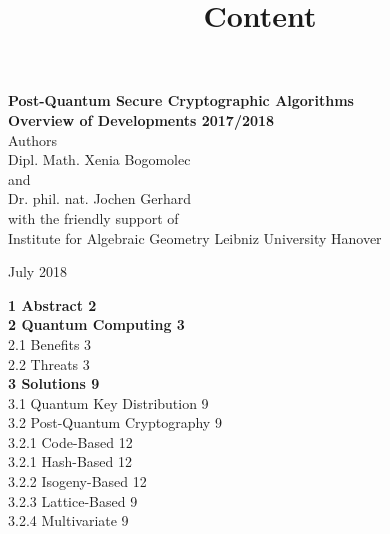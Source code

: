 \documentclass[a4paper,11pt]{article}
\begin{document}
\begin{titlepage}
\begin{center}

{\Huge{\textbf{Post-Quantum Secure Cryptographic Algorithms}}}\\[2cm]

\huge{\textbf{Overview of Developments 2017/2018}}\\[1cm]

\large{Authors}\\[0,2cm]

\Large{Dipl. Math. Xenia Bogomolec}\\ [0,2cm]  
\large{and }\\[0,2cm] 

\Large{Dr. phil. nat. Jochen Gerhard}\\ [1,4cm] 


\large{with the friendly support of}\\[0,2cm]

\Large{Institute for Algebraic Geometry Leibniz University Hanover}\\[1cm]


 
\vspace{1cm}
 
\large{July 2018}
\end{center}
\end{titlepage}


\title{\textbf{\Large{Content}}}
\maketitle


\noindent
\textbf{1 Abstract \hfill 2}\\[0,5cm]
\textbf{2 Quantum Computing \hfill 3}\\[0,3cm]
	\hspace*{0,5cm}2.1 Benefits \hfill 3\\[0,3cm]
	\hspace*{0,5cm}2.2 Threats \hfill 3\\[0,3cm]
\textbf{3 Solutions \hfill 9}\\[0,3cm]
	\hspace*{0,5cm}3.1 Quantum Key Distribution \hfill 9\\[0,3cm]
	\hspace*{0,5cm}3.2 Post-Quantum Cryptography \hfill 9\\[0,3cm]
		\hspace*{1cm}3.2.1 Code-Based \hfill 12\\[0,3cm]
		\hspace*{1cm}3.2.1 Hash-Based \hfill 12\\[0,3cm]
		\hspace*{1cm}3.2.2 Isogeny-Based \hfill 12\\[0,3cm]
		\hspace*{1cm}3.2.3 Lattice-Based \hfill 9\\[0,3cm]
		\hspace*{1cm}3.2.4 Multivariate \hfill 9\\[0,3cm]
\end{document}
